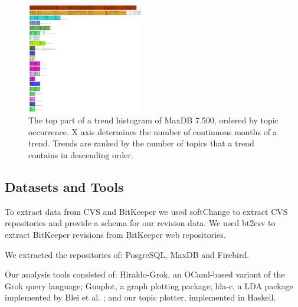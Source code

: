 \documentclass[times, 10pt,twocolumn]{article}
\begin{document}
\begin{figure}
  \centering
  \includegraphics[width=0.45\textwidth]{histogram-cropped-scaled}
  \caption{The top part of a trend histogram of MaxDB 7.500, ordered
    by topic occurrence. X axis determines the number of continuous
    months of a trend. Trends are ranked by the number of topics that
    a trend contains in descending order.}
  \label{fig:histogram}
\end{figure}


\subsection{Datasets and Tools}

To extract data from CVS and BitKeeper we used softChange to extract
CVS repositories and provide a schema for our revision data. We used
bt2csv to extract BitKeeper revisions from BitKeeper web repositories.

We extracted the repositories of: PosgreSQL, MaxDB and
Firebird.


Our analysis tools consisted of: Hiraldo-Grok, an OCaml-based variant
of the Grok query language; Gnuplot, a graph plotting package; lda-c,
a LDA package implemented by Blei et al. \cite{944937}; and our topic
plotter, implemented in Haskell.




\end{document}
